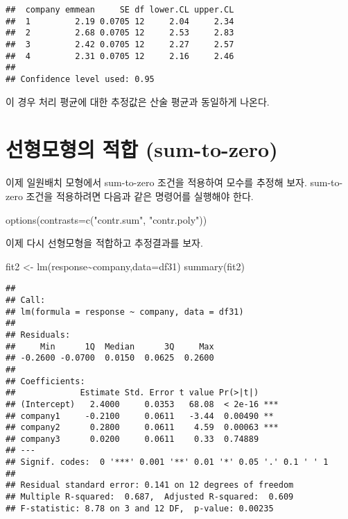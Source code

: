 \documentclass[
]{book}
\newenvironment{Shaded}{\begin{snugshade}}{\end{snugshade}}
\newcommand{\AttributeTok}[1]{\textcolor[rgb]{0.77,0.63,0.00}{#1}}
\newcommand{\FunctionTok}[1]{\textcolor[rgb]{0.00,0.00,0.00}{#1}}
\newcommand{\NormalTok}[1]{#1}
\newcommand{\OtherTok}[1]{\textcolor[rgb]{0.56,0.35,0.01}{#1}}
\newcommand{\SpecialCharTok}[1]{\textcolor[rgb]{0.00,0.00,0.00}{#1}}
\newcommand{\StringTok}[1]{\textcolor[rgb]{0.31,0.60,0.02}{#1}}
\begin{document}
\begin{verbatim}
##  company emmean     SE df lower.CL upper.CL
##  1         2.19 0.0705 12     2.04     2.34
##  2         2.68 0.0705 12     2.53     2.83
##  3         2.42 0.0705 12     2.27     2.57
##  4         2.31 0.0705 12     2.16     2.46
## 
## Confidence level used: 0.95
\end{verbatim}

이 경우 처리 평균에 대한 추정값은 산술 평균과 동일하게 나온다.

\hypertarget{uxc120uxd615uxbaa8uxd615uxc758-uxc801uxd569-sum-to-zero}{%
\section{선형모형의 적합 (sum-to-zero)}\label{uxc120uxd615uxbaa8uxd615uxc758-uxc801uxd569-sum-to-zero}}

이제 일원배치 모형에서 sum-to-zero 조건을 적용하여 모수를 추정해 보자.
sum-to-zero 조건을 적용하려면 다음과 같은 명령어를 실행해야 한다.

\begin{Shaded}
\begin{Highlighting}[]
\FunctionTok{options}\NormalTok{(}\AttributeTok{contrasts=}\FunctionTok{c}\NormalTok{(}\StringTok{"contr.sum"}\NormalTok{, }\StringTok{"contr.poly"}\NormalTok{))}
\end{Highlighting}
\end{Shaded}

이제 다시 선형모형을 적합하고 추정결과를 보자.

\begin{Shaded}
\begin{Highlighting}[]
\NormalTok{fit2 }\OtherTok{\textless{}{-}} \FunctionTok{lm}\NormalTok{(response}\SpecialCharTok{\textasciitilde{}}\NormalTok{company,}\AttributeTok{data=}\NormalTok{df31)}
\FunctionTok{summary}\NormalTok{(fit2)}
\end{Highlighting}
\end{Shaded}

\begin{verbatim}
## 
## Call:
## lm(formula = response ~ company, data = df31)
## 
## Residuals:
##     Min      1Q  Median      3Q     Max 
## -0.2600 -0.0700  0.0150  0.0625  0.2600 
## 
## Coefficients:
##             Estimate Std. Error t value Pr(>|t|)    
## (Intercept)   2.4000     0.0353   68.08  < 2e-16 ***
## company1     -0.2100     0.0611   -3.44  0.00490 ** 
## company2      0.2800     0.0611    4.59  0.00063 ***
## company3      0.0200     0.0611    0.33  0.74889    
## ---
## Signif. codes:  0 '***' 0.001 '**' 0.01 '*' 0.05 '.' 0.1 ' ' 1
## 
## Residual standard error: 0.141 on 12 degrees of freedom
## Multiple R-squared:  0.687,  Adjusted R-squared:  0.609 
## F-statistic: 8.78 on 3 and 12 DF,  p-value: 0.00235
\end{verbatim}
\end{document}
